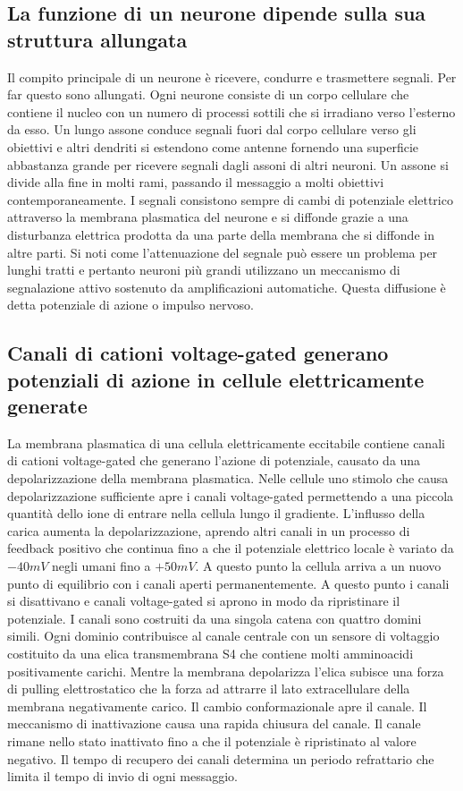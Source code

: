 \subsection{La funzione di un neurone dipende sulla sua struttura allungata}
Il compito principale di un neurone \`e ricevere, condurre e trasmettere segnali. Per far questo sono allungati. Ogni neurone consiste di un corpo cellulare che contiene il nucleo con
un numero di processi sottili che si irradiano verso l'esterno da esso. Un lungo assone conduce segnali fuori dal corpo cellulare verso gli obiettivi e altri dendriti si estendono
come antenne fornendo una superficie abbastanza grande per ricevere segnali dagli assoni di altri neuroni. Un assone si divide alla fine in molti rami, passando il messaggio a 
molti obiettivi contemporaneamente. I segnali consistono sempre di cambi di potenziale elettrico attraverso la membrana plasmatica del neurone e si diffonde grazie a una disturbanza
elettrica prodotta da una parte della membrana che si diffonde in altre parti. Si noti come l'attenuazione del segnale pu\`o essere un problema per lunghi tratti e pertanto neuroni pi\`u
grandi utilizzano un meccanismo di segnalazione attivo sostenuto da amplificazioni automatiche. Questa diffusione \`e detta potenziale di azione o impulso nervoso. 
\subsection{Canali di cationi voltage-gated generano potenziali di azione in cellule elettricamente generate}
La membrana plasmatica di una cellula elettricamente eccitabile contiene canali di cationi voltage-gated che generano l'azione di potenziale, causato da una depolarizzazione della
membrana plasmatica. Nelle cellule uno stimolo che causa depolarizzazione sufficiente apre i canali voltage-gated  permettendo a una piccola quantit\`a dello ione di entrare
nella cellula lungo il gradiente. L'influsso della carica aumenta la depolarizzazione, aprendo altri canali in un processo di feedback positivo che continua fino a che il potenziale
elettrico locale \`e variato da $-40mV$ negli umani fino a $+50mV$. A questo punto la cellula arriva a un nuovo punto di equilibrio con i canali  aperti permanentemente. A
questo punto i canali  si disattivano e canali voltage-gated  si aprono in modo da ripristinare il potenziale. I canali  sono costruiti da una singola catena
con quattro domini simili. Ogni dominio contribuisce al canale centrale con un sensore di voltaggio costituito da una elica transmembrana S4 che contiene molti amminoacidi positivamente
carichi. Mentre la membrana depolarizza l'elica subisce una forza di pulling elettrostatico che la forza ad attrarre il lato extracellulare della membrana negativamente carico. Il
cambio conformazionale apre il canale. Il meccanismo di inattivazione causa una rapida chiusura del canale. Il canale rimane nello stato inattivato fino a che il potenziale
\`e ripristinato al valore negativo. Il tempo di recupero dei canali determina un periodo refrattario che limita il tempo di invio di ogni messaggio.
